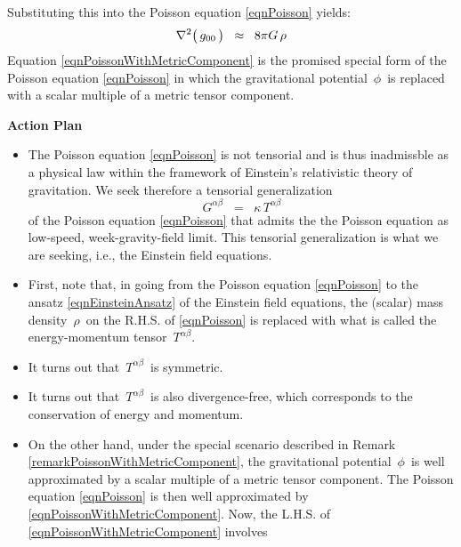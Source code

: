 \begin{remark}
\begin{equation*}
\end{equation*}
Substituting this into the Poisson equation \eqref{eqnPoisson} yields:
\begin{equation}\label{eqnPoissonWithMetricComponent}
\nabla^{2}\!\left(\,\overset{{\color{white}.}}{g_{00}}\,\right) \;\; \approx \;\; 8 \pi G \, \rho
\end{equation}
Equation \eqref{eqnPoissonWithMetricComponent} is the promised special form
of the Poisson equation \eqref{eqnPoisson}
in which the gravitational potential \,$\phi$\, is replaced with a scalar multiple of a metric tensor component.
\end{remark}


\vskip 0.3cm
\noindent
\textbf{Action Plan}
\begin{itemize}
\item
	The Poisson equation \eqref{eqnPoisson} is not tensorial and is thus inadmissble
	as a physical law within the framework of Einstein's relativistic theory of gravitation.
	We seek therefore a tensorial generalization
	\begin{equation}\label{eqnEinsteinAnsatz}
	G^{\alpha\beta} \;\; = \;\; \kappa\,T^{\alpha\beta}
	\end{equation}
	of the Poisson equation \eqref{eqnPoisson} that admits the the Poisson equation
	as low-speed, week-gravity-field limit.
	This tensorial generalization is what we are seeking, i.e.,
	the Einstein field equations.
\item
	First, note that, in going
	from the Poisson equation \eqref{eqnPoisson}
	to the ansatz \eqref{eqnEinsteinAnsatz} of the Einstein field equations,
	the (scalar) mass density \,$\rho$\, on the R.H.S. of \eqref{eqnPoisson}
	is replaced with what is called the energy-momentum tensor \,$T^{\alpha\beta}$.
\item
	It turns out that \,$T^{\alpha\beta}$\, is symmetric.
\item
	It turns out that \,$T^{\alpha\beta}$\, is also divergence-free,
	which corresponds to the conservation of energy and momentum.
\item
	On the other hand, 
	under the special scenario described in Remark \ref{remarkPoissonWithMetricComponent},
	the gravitational potential \,$\phi$\, is well approximated by a scalar multiple of a metric tensor component.
	The Poisson equation \eqref{eqnPoisson} is then well approximated by \eqref{eqnPoissonWithMetricComponent}.
	Now, the L.H.S. of \eqref{eqnPoissonWithMetricComponent} involves

\end{itemize}
